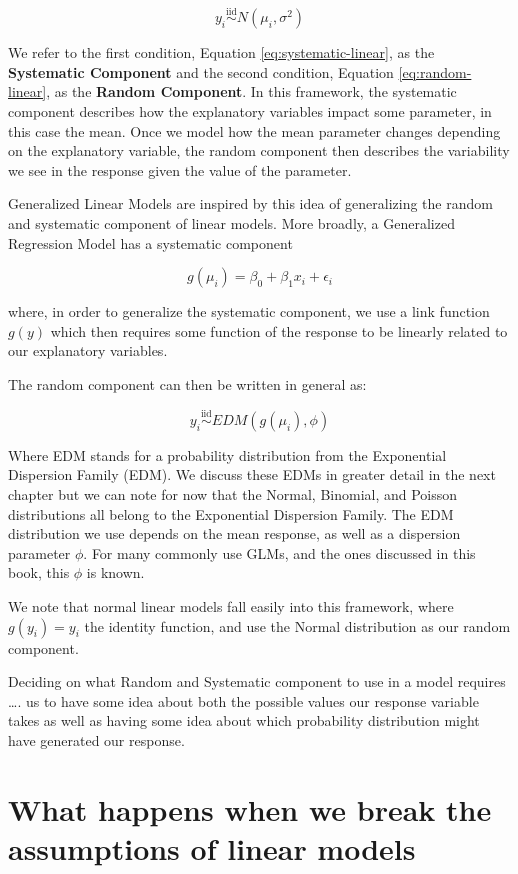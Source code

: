 \documentclass[
]{book}
\begin{document}
\begin{equation}
y_i \overset{\text{iid}}{\sim} N(\mu_i, \sigma^2)\label{eq:random-linear}
\end{equation}

We refer to the first condition, Equation \eqref{eq:systematic-linear}, as the \textbf{Systematic Component} and the second condition, Equation \eqref{eq:random-linear}, as the \textbf{Random Component}. In this framework, the systematic component describes how the explanatory variables impact some parameter, in this case the mean. Once we model how the mean parameter changes depending on the explanatory variable, the random component then describes the variability we see in the response given the value of the parameter.

Generalized Linear Models are inspired by this idea of generalizing the random and systematic component of linear models. More broadly, a Generalized Regression Model has a systematic component

\[ g(\mu_i) = \beta_0 + \beta_1 x_i + \epsilon_i\]

where, in order to generalize the systematic component, we use a link function \(g(y)\) which then requires some function of the response to be linearly related to our explanatory variables.

The random component can then be written in general as:

\[y_i \overset{\text{iid}}{\sim} EDM(g(\mu_i), \phi) \]

Where EDM stands for a probability distribution from the Exponential Dispersion Family (EDM). We discuss these EDMs in greater detail in the next chapter but we can note for now that the Normal, Binomial, and Poisson distributions all belong to the Exponential Dispersion Family. The EDM distribution we use depends on the mean response, as well as a dispersion parameter \(\phi\). For many commonly use GLMs, and the ones discussed in this book, this \(\phi\) is known.

We note that normal linear models fall easily into this framework, where \(g(y_i) = y_i\) the identity function, and use the Normal distribution as our random component.

Deciding on what Random and Systematic component to use in a model requires \ldots.
us to have some idea about both the possible values our response variable takes as well as having some idea about which probability distribution might have generated our response.

\hypertarget{what-happens-when-we-break-the-assumptions-of-linear-models}{%
\section{What happens when we break the assumptions of linear models}\label{what-happens-when-we-break-the-assumptions-of-linear-models}}
\end{document}
